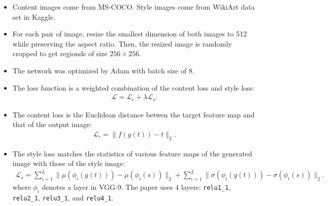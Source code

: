 \documentclass[10pt]{article}
\begin{document}
  \begin{itemize}
  	\item Content images come from MS-COCO. Style images come from WikiArt data set in Kaggle.

  	\item For each pair of image, resize the smallest dimension of both images to 512 while preserving the aspect ratio. Then, the resized image is randomly cropped to get regionds of size $256 \times 256$. 

  	\item The network was optimized by Adam with batch size of 8.

  	\item The loss function is a weighted combination of the content loss and style loss:
  	\begin{align*}
  		\mathcal{L} = \mathcal{L}_c + \lambda \mathcal{L}_s.
  	\end{align*}
  	
  	\item The content loss is the Euclidean distance betwen the target feature map and that of the output image:
  	\begin{align*}
  		\mathcal{L}_c = \| f(g(t)) - t \|_2.
  	\end{align*}

  	\item The style loss matches the statistics of various feature maps of the generated image with those of the style image:
  	\begin{align*}
  		\mathcal{L}_s = \sum_{i=1}^L \| \mu(\phi_i(g(t))) - \mu(\phi_i(s)) \|_2 + \sum_{i=1}^L \| \sigma(\phi_i(g(t))) - \sigma(\phi_i(s)) \|_2.
  	\end{align*}
  	where $\phi_i$ denotes a layer in VGG-9. The paper uses 4 layers: \texttt{relu1\_1}, \texttt{relu2\_1}, \texttt{relu3\_1}, and \texttt{relu4\_1}.
  \end{itemize}

  
    
\end{document}

